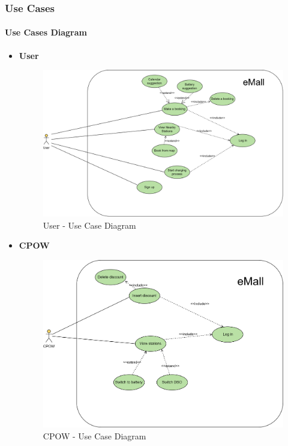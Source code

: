 \documentclass[table, 12pt]{article} %
\begin{document}
    \newpage
    \subsubsection{Use Cases}
    \setcounter{secnumdepth}{4}

      \paragraph{Use Cases Diagram}
    \begin{itemize}
        \item \textbf {User}
        \begin{center}
            \begin{figure}[H]
                \includegraphics[scale=0.55, center]{assets/USER use case.png}
                \caption{User - Use Case Diagram}
                \label{fig: UseCase_User}
            \end{figure}
        \end{center}
        \newpage
        \item \textbf {CPOW}
        \begin{center}
            \begin{figure}[H]
                \includegraphics[scale=0.60, center]{assets/CPOW use case.png}
                \caption{CPOW - Use Case Diagram}
                \label{fig: UseCase_CPOW}
            \end{figure}
        \end{center}
        \newpage
    \end{itemize}
\end{document}
